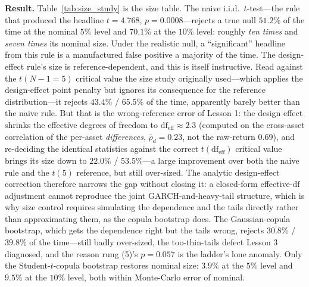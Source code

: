 \documentclass[pdflatex,sn-mathphys-num]{sn-jnl}
\theoremstyle{thmstyleone}
\theoremstyle{thmstyletwo}
\theoremstyle{thmstylethree}
\begin{document}
\textbf{Result.} Table~\ref{tab:size_study} is the size table. The naive i.i.d.\ $t$-test---the rule that produced the headline $t=4.768$, $p=0.0008$---rejects a true null $\mathbf{51.2\%}$ of the time at the nominal $5\%$ level and $\mathbf{70.1\%}$ at the $10\%$ level: roughly \emph{ten times} and \emph{seven times} its nominal size. Under the realistic null, a ``significant'' headline from this rule is a manufactured false positive a majority of the time. The design-effect rule's size is reference-dependent, and this is itself instructive. Read against the $t(N{-}1{=}5)$ critical value the size study originally used---which applies the design-effect point penalty but ignores its consequence for the reference distribution---it rejects $43.4\%$ / $65.5\%$ of the time, apparently barely better than the naive rule. But that is the wrong-reference error of Lesson 1: the design effect shrinks the effective degrees of freedom to $\mathrm{df}_{\text{eff}}\approx 2.3$ (computed on the cross-asset correlation of the per-asset \emph{differences}, $\bar\rho_d=0.23$, not the raw-return $0.69$), and re-deciding the identical statistics against the correct $t(\mathrm{df}_{\text{eff}})$ critical value brings its size down to $\mathbf{22.0\%}$ / $\mathbf{53.5\%}$---a large improvement over both the naive rule and the $t(5)$ reference, but still over-sized. The analytic design-effect correction therefore narrows the gap without closing it: a closed-form effective-$\mathrm{df}$ adjustment cannot reproduce the joint GARCH-and-heavy-tail structure, which is why size control requires simulating the dependence and the tails directly rather than approximating them, as the copula bootstrap does. The Gaussian-copula bootstrap, which gets the dependence right but the tails wrong, rejects $30.8\%$ / $39.8\%$ of the time---still badly over-sized, the too-thin-tails defect Lesson 3 diagnosed, and the reason rung (5)'s $p=0.057$ is the ladder's lone anomaly. Only the Student-$t$-copula bootstrap restores nominal size: $\mathbf{3.9\%}$ at the $5\%$ level and $\mathbf{9.5\%}$ at the $10\%$ level, both within Monte-Carlo error of nominal.
\end{document}

